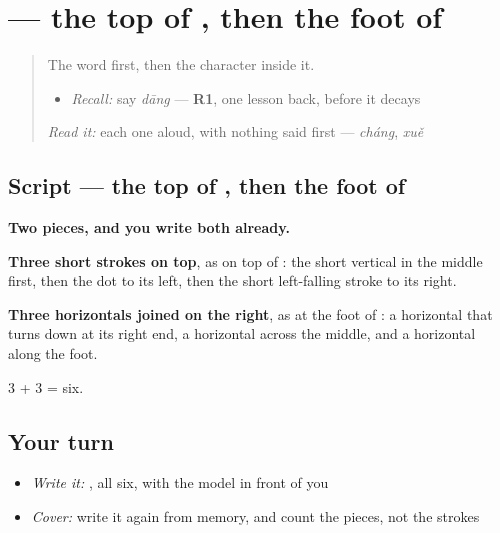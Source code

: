 \section[\texorpdfstring{\zh{当} (dāng)}{当 (dāng)}]{ — the top of , then the foot of }

\label{lesson:ZH-W287-dang}



\begin{quote}
The word first, then the character inside it.

\begin{itemize}
\raggedright
  \item \emph{Recall:} say \emph{dāng} — \textbf{R1}, one lesson back, before it decays
\end{itemize}

\begin{quote}
 
\end{quote}

\emph{Read it:} each one aloud, with nothing said first — \emph{cháng}, \emph{xuě}
\end{quote}

\subsection*{Script — the top of , then the foot of }

\begin{quote}
\end{quote}

\textbf{Two pieces, and you write both already.}

\textbf{Three short strokes on top}, as on top of : the short vertical in the middle first, then the dot to its left, then the short left-falling stroke to its right.

\textbf{Three horizontals joined on the right}, as at the foot of : a horizontal that turns down at its right end, a horizontal across the middle, and a horizontal along the foot.

3 + 3 = six.

\subsection*{Your turn}
\begin{itemize}
\raggedright
  \item \emph{Write it:} , all six, with the model in front of you
  \item \emph{Cover:} write it again from memory, and count the pieces, not the strokes
\end{itemize}

